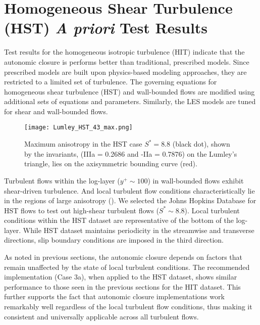 \section{Homogeneous Shear Turbulence (HST) \textit{A priori} Test Results}
\label{sec:IVHST}

Test results for the homogeneous isotropic turbulence (HIT) indicate that the autonomic closure is performs better than traditional, prescribed models.  Since prescribed models are built upon physics-based modeling approaches, they are restricted to a limited set of turbulence. The governing equations for homogeneous shear turbulence (HST) and wall-bounded flows are modified using additional sets of equations and parameters. Similarly, the LES models are tuned for shear and wall-bounded flows. 

%
\begin{figure}
	\begin{center} 
	\texttt{[image: Lumley\_HST\_43\_max.png]}
	\caption{Maximum anisotropy in the HST case $S^* = 8.8$ (black dot), shown by the invariants, (IIIa = 0.2686 and -IIa = 0.7876) on the Lumley’s triangle, lies on the axisymmetric bounding curve (red).}
	\label{F:Lumley}
	\end{center}
\end{figure}
%
%

Turbulent flows within the log-layer ($y^+\sim100$) in wall-bounded flows exhibit shear-driven turbulence. And local turbulent flow conditions characteristically lie in the regions of large anisotropy (). We selected the Johns Hopkins Database for HST flows to test out high-shear turbulent flows ($S^*\sim8.8$). Local turbulent conditions within the HST dataset \cite{jhu256} are representative of the bottom of the log-layer. While HST dataset maintains periodicity in the streamwise and transverse directions, slip boundary conditions are imposed in the third direction.

As noted in previous sections, the autonomic closure depends on factors that remain unaffected by the state of local turbulent conditions. The recommended implementation (Case 3a), when applied to the HST dataset, shows similar performance to those seen in the previous sections for the HIT dataset. This further supports the fact that autonomic closure implementations work remarkably well regardless of the local turbulent flow conditions, thus making it consistent and universally applicable across all turbulent flows.


